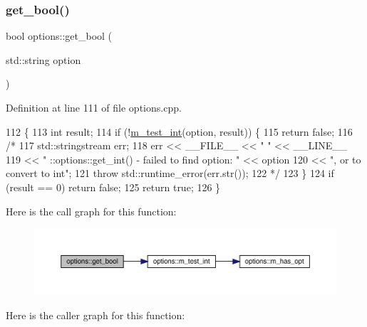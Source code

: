 \subsubsection{\texorpdfstring{get\+\_\+bool()}{get\_bool()}\hspace{0.1cm}{\footnotesize\ttfamily [1/2]}}
{\footnotesize\ttfamily bool options\+::get\+\_\+bool (\begin{DoxyParamCaption}\item[{std\+::string}]{option }\end{DoxyParamCaption})}



Definition at line 111 of file options.\+cpp.


\begin{DoxyCode}
112 \{
113   \textcolor{keywordtype}{int} result;
114   \textcolor{keywordflow}{if} (!\hyperlink{classoptions_ad9b4461e633b73acc2fde7752ef60d41}{m\_test\_int}(option, result)) \{
115     \textcolor{keywordflow}{return} \textcolor{keyword}{false};
116     \textcolor{comment}{/*}
117 \textcolor{comment}{    std::stringstream err;}
118 \textcolor{comment}{    err << \_\_FILE\_\_ << " " << \_\_LINE\_\_}
119 \textcolor{comment}{        << " ::options::get\_int() - failed to find option: " << option}
120 \textcolor{comment}{        << ", or to convert to int";}
121 \textcolor{comment}{    throw std::runtime\_error(err.str());}
122 \textcolor{comment}{    */}
123   \}
124   \textcolor{keywordflow}{if} (result == 0) \textcolor{keywordflow}{return} \textcolor{keyword}{false};
125   \textcolor{keywordflow}{return} \textcolor{keyword}{true};
126 \}
\end{DoxyCode}
Here is the call graph for this function\+:\nopagebreak
\begin{figure}[H]
\begin{center}
\leavevmode
\includegraphics[width=350pt]{classoptions_a99aa190102de33e2aed39723929f9fad_cgraph}
\end{center}
\end{figure}
Here is the caller graph for this function\+:\nopagebreak
